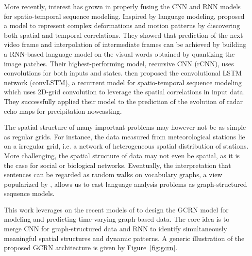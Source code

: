 \documentclass{article}
\newcommand{\todo}[1]{{\color{red} #1 }}
\newcommand{\figref}[1]{Figure~\ref{fig:#1}}
\begin{document}
More recently, interest has grown in properly fusing the CNN and RNN models for
spatio-temporal sequence modeling. Inspired by language modeling,
\citet{video_language_model} proposed a model to represent complex deformations
and motion patterns by discovering both spatial and temporal correlations. They showed that prediction of the next video frame and
interpolation of intermediate frames can be achieved by building a RNN-based
language model on the visual words obtained by quantizing the image patches.
Their highest-performing model, recursive CNN (rCNN), uses convolutions for both
 inputs and states. \citet{convlstm}  then proposed the convolutional
LSTM network (convLSTM), a recurrent model for spatio-temporal sequence
modeling which uses 2D-grid convolution to leverage the spatial correlations in
input data. They successfully applied their model to the prediction of the
evolution of radar echo maps for precipitation nowcasting.



The spatial structure of many important problems may however not be as simple as regular grids. For instance, 
the data measured from meteorological stations lie on a irregular grid, i.e. a network of heterogeneous spatial
distribution of stations. More challenging, the spatial structure of data may not even be spatial, as it is the case for social or biological networks. Eventually, the interpretation that sentences can be regarded as random walks on vocabulary graphs,
a view popularized by \cite{word2vec}, allows us to cast language analysis problems as graph-structured sequence models.

This work leverages on the recent models of
\cite{gcnn,video_language_model,convlstm} to design the GCRN model for modeling
and predicting time-varying graph-based data. The core idea is to merge CNN for
graph-structured data and RNN to identify simultaneously meaningful spatial
structures and dynamic patterns. A generic illustration of the proposed GCRN
architecture is given by \figref{gcrn}.
\end{document}
